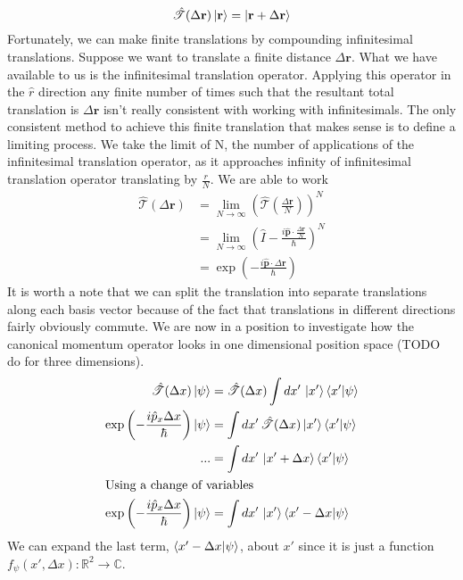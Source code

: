 \documentclass[12pt]{article}
\numberwithin{equation}{section}
\begin{document}
\begin{equation}
    \hat{\mathscr{T}}(\Delta\textbf{r})\ket{\textbf{r}} = \ket{\textbf{r} + \Delta\textbf{r}}
\end{equation}
Fortunately, we can make finite translations by compounding infinitesimal translations. Suppose we want to translate a finite distance $\Delta\textbf{r}$. What we have available to us is the infinitesimal translation operator. Applying this operator in the $\hat{r}$ direction any finite number of times such that the resultant total translation is $\Delta\textbf{r}$ isn't really consistent with working with infinitesimals. The only consistent method to achieve this finite translation that makes sense is to define a limiting process. We take the limit of N, the number of applications of the infinitesimal translation operator, as it approaches infinity of infinitesimal translation operator translating by $\frac{r}{N}$. We are able to work
\begin{align}
    \hat{\mathscr{T}}(\Delta\textbf{r}) &= \lim_{N\to\infty} \left(\hat{\mathscr{T}}(\frac{\Delta\textbf{r}}{N})\right)^N\\
    &= \lim_{N\to\infty} \left(\hat{I} - \frac{i\hat{\textbf{p}}\cdot \frac{\Delta\textbf{r}}{N}}{\hbar}\right)^N\\
    &= \exp\left({-\frac{i\hat{\textbf{p}} \cdot \Delta\textbf{r}}{\hbar}}\right)
\end{align}
It is worth a note that we can split the translation into separate translations along each basis vector because of the fact that translations in different directions fairly obviously commute.
We are now in a position to investigate how the canonical momentum operator looks in one dimensional position space (TODO do for three dimensions).
\begin{align}
    \hat{\mathscr{T}}(\Delta x)\ket{\psi} &= \hat{\mathscr{T}}(\Delta x) \int dx' \, \ket{x'}\braket{x' | \psi}\\
    \exp\left(-\frac{i\hat{p}_x \Delta x}{\hbar}\right)\ket{\psi} &= \int dx' \, \hat{\mathscr{T}}(\Delta x)\ket{x'}\braket{x' | \psi}\\
    ... &= \int dx' \, \ket{x' + \Delta x}\braket{x' | \psi}\\
    \intertext{Using a change of variables}
    \exp\left(-\frac{i\hat{p}_x \Delta x}{\hbar}\right)\ket{\psi} &= \int dx' \, \ket{x'} \braket{x' - \Delta x | \psi}\\
\end{align}
We can expand the last term, $\braket{x' - \Delta x | \psi}$, about $x'$ since it is just a function $f_\psi(x', \Delta x) : \mathbb{R}^2 \rightarrow \mathbb{C}$.
\end{document}

